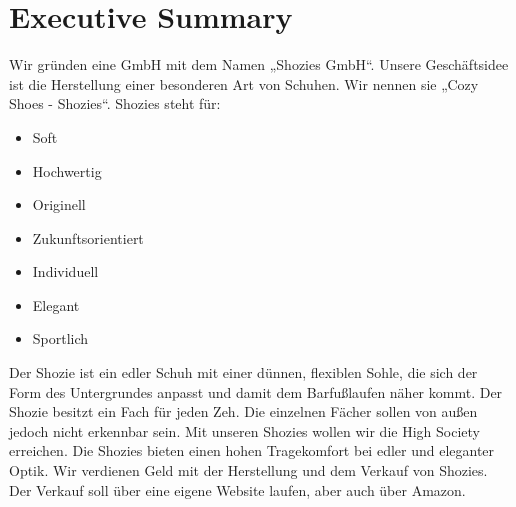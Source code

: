 \chapter{Executive Summary}
\label{cha:1}
Wir gründen eine GmbH mit dem Namen „Shozies GmbH“. Unsere Geschäftsidee ist die Herstellung einer besonderen Art von Schuhen. Wir nennen sie „Cozy Shoes - Shozies“. 
Shozies steht für:
\begin{itemize}
	\item Soft
	\item Hochwertig%
	\item Originell
	\item Zukunftsorientiert
	\item Individuell
	\item Elegant
	\item Sportlich
\end{itemize}
Der Shozie ist ein edler Schuh mit einer dünnen, flexiblen Sohle, die sich der Form des Untergrundes anpasst und damit dem Barfußlaufen näher kommt. Der Shozie besitzt ein Fach für jeden Zeh. Die einzelnen Fächer sollen von außen jedoch nicht erkennbar sein.
Mit unseren Shozies wollen wir die High Society erreichen.
Die Shozies bieten einen hohen Tragekomfort bei edler und eleganter Optik.
Wir verdienen Geld mit der Herstellung und dem Verkauf von Shozies.
Der Verkauf soll über eine eigene Website laufen, aber auch über Amazon.
